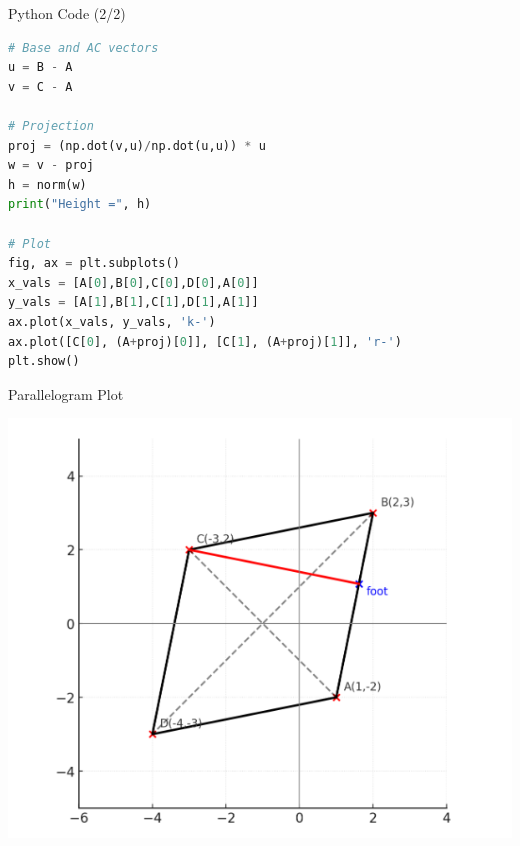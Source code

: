 \documentclass{beamer}
\begin{document}
\begin{frame}[fragile]{Python Code (2/2)}
\begin{lstlisting}[language=Python]
# Base and AC vectors
u = B - A
v = C - A

# Projection
proj = (np.dot(v,u)/np.dot(u,u)) * u
w = v - proj
h = norm(w)
print("Height =", h)

# Plot
fig, ax = plt.subplots()
x_vals = [A[0],B[0],C[0],D[0],A[0]]
y_vals = [A[1],B[1],C[1],D[1],A[1]]
ax.plot(x_vals, y_vals, 'k-')
ax.plot([C[0], (A+proj)[0]], [C[1], (A+proj)[1]], 'r-')
plt.show()
\end{lstlisting}
\end{frame}

\begin{frame}{Parallelogram Plot}
\begin{center}
\includegraphics[width=0.7\columnwidth]{figs/fig4.png}
\end{center}
\end{frame}
\end{document}
